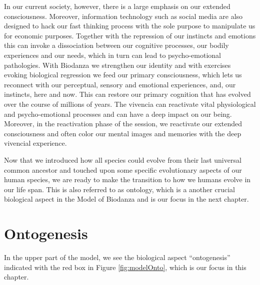 \documentclass[
  11pt,
]{book}
\begin{document}
In our current society, however, there is a large emphasis on our extended consciousness. Moreover, information technology such as social media are also designed to hack our fast thinking process with the sole purpose to manipulate us for economic purposes. Together with the repression of our instincts and emotions this can invoke a dissociation between our cognitive processes, our bodily experiences and our needs, which in turn can lead to psycho-emotional pathologies. With Biodanza we strengthen our identity and with exercises evoking biological regression we feed our primary consciousness, which lets us reconnect with our perceptual, sensory and emotional experiences, and, our instincts, here and now. This can restore our primary cognition that has evolved over the course of millions of years. The vivencia can reactivate vital physiological and psycho-emotional processes and can have a deep impact on our being. Moreover, in the reactivation phase of the session, we reactivate our extended consciousness and often color our mental images and memories with the deep vivencial experience.

Now that we introduced how all species could evolve from their last universal common ancestor and touched upon some specific evolutionary aspects of our human species, we are ready to make the transition to how we humans evolve in our life span. This is also referred to as ontology, which is a another crucial biological aspect in the Model of Biodanza and is our focus in the next chapter.

\hypertarget{ontogenesis}{%
\chapter{Ontogenesis}\label{ontogenesis}}

In the upper part of the model, we see the biological aspect ``ontogenesis'' indicated with the red box in Figure \ref{fig:modelOnto}, which is our focus in this chapter.
\end{document}
